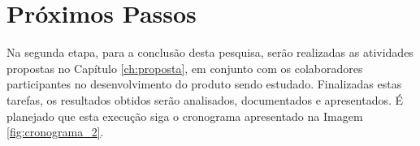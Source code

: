 \section{Próximos Passos}

Na segunda etapa, para a conclusão desta pesquisa, serão realizadas as atividades propostas no Capítulo \ref{ch:proposta}, em conjunto com os colaboradores participantes no desenvolvimento do produto sendo estudado. Finalizadas estas tarefas, os resultados obtidos serão analisados, documentados e apresentados. É planejado que esta execução siga o cronograma apresentado na Imagem \ref{fig:cronograma_2}.